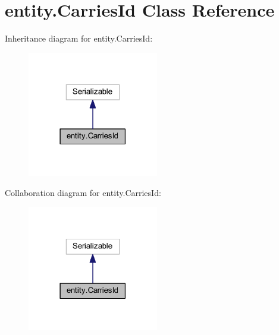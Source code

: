 \hypertarget{classentity_1_1_carries_id}{}\section{entity.\+Carries\+Id Class Reference}
\label{classentity_1_1_carries_id}


Inheritance diagram for entity.\+Carries\+Id\+:\nopagebreak
\begin{figure}[H]
\begin{center}
\leavevmode
\includegraphics[width=162pt]{classentity_1_1_carries_id__inherit__graph}
\end{center}
\end{figure}


Collaboration diagram for entity.\+Carries\+Id\+:\nopagebreak
\begin{figure}[H]
\begin{center}
\leavevmode
\includegraphics[width=162pt]{classentity_1_1_carries_id__coll__graph}
\end{center}
\end{figure}
